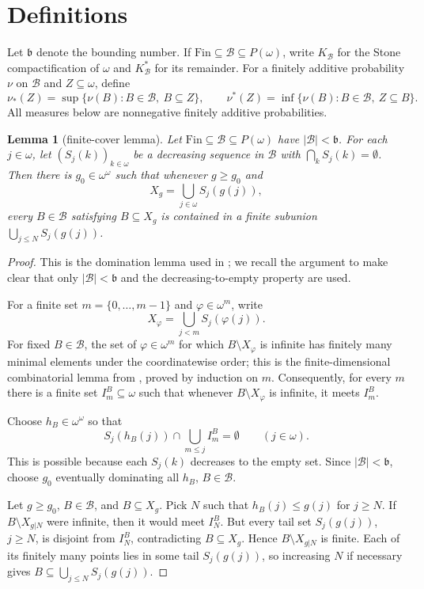 \documentclass[11pt]{amsart}
\newtheorem{lemma}[theorem]{Lemma}
\theoremstyle{definition}
\newcommand{\Fin}{\mathrm{Fin}}
\begin{document}
\section*{Definitions}

Let \(\mathfrak b\) denote the bounding number.  If
\(\Fin\subseteq\mathcal B\subseteq P(\omega)\), write \(K_\mathcal B\) for the
Stone compactification of \(\omega\) and \(K_\mathcal B^*\) for its remainder.
For a finitely additive probability \(\nu\) on \(\mathcal B\) and
\(Z\subseteq\omega\), define
\[
        \nu_*(Z)=\sup\{\nu(B):B\in\mathcal B,\ B\subseteq Z\},
        \qquad
        \nu^*(Z)=\inf\{\nu(B):B\in\mathcal B,\ Z\subseteq B\}.
\]
All measures below are nonnegative finitely additive probabilities.

\begin{lemma}[finite-cover lemma]\label{lem:finite-cover}
Let \(\Fin\subseteq\mathcal B\subseteq P(\omega)\) have
\(|\mathcal B|<\mathfrak b\).  For each \(j\in\omega\), let
\((S_j(k))_{k\in\omega}\) be a decreasing sequence in \(\mathcal B\) with
\(\bigcap_k S_j(k)=\emptyset\).  Then there is \(g_0\in\omega^\omega\) such
that whenever \(g\ge g_0\) and
\[
        X_g=\bigcup_{j\in\omega}S_j(g(j)),
\]
every \(B\in\mathcal B\) satisfying \(B\subseteq X_g\) is contained in a finite
subunion \(\bigcup_{j\le N}S_j(g(j))\).
\end{lemma}

\begin{proof}
This is the domination lemma used in \cite{DP2015}; we recall the argument to
make clear that only \(|\mathcal B|<\mathfrak b\) and the decreasing-to-empty
property are used.

For a finite set \(m=\{0,\ldots,m-1\}\) and \(\varphi\in\omega^m\), write
\[
        X_\varphi=\bigcup_{j<m}S_j(\varphi(j)).
\]
For fixed \(B\in\mathcal B\), the set of \(\varphi\in\omega^m\) for which
\(B\setminus X_\varphi\) is infinite has finitely many minimal elements under
the coordinatewise order; this is the finite-dimensional combinatorial lemma
from \cite[Lemma 4.1]{DP2015}, proved by induction on \(m\).
Consequently, for every \(m\) there is a finite set \(I_m^B\subseteq\omega\)
such that whenever \(B\setminus X_\varphi\) is infinite, it meets \(I_m^B\).

Choose \(h_B\in\omega^\omega\) so that
\[
        S_j(h_B(j))\cap\bigcup_{m\le j}I_m^B=\emptyset
        \qquad(j\in\omega).
\]
This is possible because each \(S_j(k)\) decreases to the empty set.  Since
\(|\mathcal B|<\mathfrak b\), choose \(g_0\) eventually dominating all
\(h_B\), \(B\in\mathcal B\).

Let \(g\ge g_0\), \(B\in\mathcal B\), and \(B\subseteq X_g\).  Pick \(N\) such
that \(h_B(j)\le g(j)\) for \(j\ge N\).  If \(B\setminus X_{g|N}\) were
infinite, then it would meet \(I_N^B\).  But every tail set
\(S_j(g(j))\), \(j\ge N\), is disjoint from \(I_N^B\), contradicting
\(B\subseteq X_g\).  Hence \(B\setminus X_{g|N}\) is finite.  Each of its
finitely many points lies in some tail \(S_j(g(j))\), so increasing \(N\) if
necessary gives \(B\subseteq\bigcup_{j\le N}S_j(g(j))\).
\end{proof}
\end{document}
